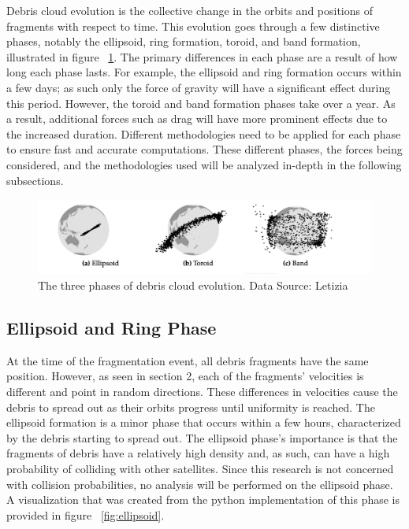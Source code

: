 \documentclass[a4paper, 12pt]{article}
\begin{document}
Debris cloud evolution is the collective change in the orbits and positions of fragments with respect to time. This evolution goes through a few distinctive phases, notably the ellipsoid,  ring formation,  toroid, and band formation, illustrated in figure ~\ref{fig:debrisphases}. The primary differences in each phase are a result of how long each phase lasts. For example, the ellipsoid and ring formation occurs within a few days; as such only the force of gravity  will have a significant effect during this period.  However, the toroid and band formation phases take over a year. As a result, additional forces such as drag will have more prominent effects due to the increased duration. Different methodologies need to be applied for each phase to ensure fast and accurate computations. These different phases, the forces being considered, and the methodologies used will be analyzed in-depth in the following subsections.
\vspace{\baselineskip}

\begin{figure}[h]
	\centering
	\includegraphics[scale=0.45]{debrisphases}
	\caption{The three phases of debris cloud evolution. Data Source: Letizia}
	\label{fig:debrisphases}
\end{figure}


\subsection{Ellipsoid and Ring Phase}

At the time of the fragmentation event, all debris fragments have the same position. However, as seen in section 2, each of the fragments' velocities is different and point in random directions. These differences in velocities cause the debris to spread out as their orbits progress until uniformity is reached. The ellipsoid formation is a minor phase that occurs within a few hours, characterized by the debris starting to spread out. The ellipsoid phase's importance is that the fragments of debris have a relatively high density and, as such, can have a high probability of colliding with other satellites. Since this research is not concerned with collision probabilities, no analysis will be performed on the ellipsoid phase. A visualization that was created from the python implementation of this phase is provided in figure ~\ref{fig:ellipsoid}.
\end{document}
